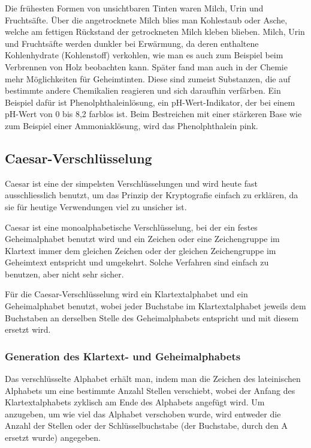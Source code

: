 Die frühesten Formen von unsichtbaren Tinten waren Milch, Urin und Fruchtsäfte. Über die angetrocknete Milch blies man Kohlestaub oder Asche, welche am fettigen Rückstand der getrockneten Milch kleben blieben. Milch, Urin und Fruchtsäfte werden dunkler bei Erwärmung, da deren enthaltene Kohlenhydrate (Kohlenstoff) verkohlen, wie man es auch zum Beispiel beim Verbrennen von Holz beobachten kann. Später fand man auch in der Chemie mehr Möglichkeiten für Geheimtinten. Diese sind zumeist Substanzen, die auf bestimmte andere Chemikalien reagieren und sich daraufhin verfärben. Ein Beispiel dafür ist Phenolphthaleinlösung, ein pH-Wert-Indikator, der bei einem pH-Wert von 0 bis 8,2 farblos ist. Beim Bestreichen mit einer stärkeren Base wie zum Beispiel einer Ammoniaklösung, wird das Phenolphthalein pink.


\newpage %
\subsection {Caesar-Verschlüsselung}
\label{sec:caesar-verschluesselung}

Caesar ist eine der simpelsten Verschlüsselungen und wird heute fast ausschliesslich benutzt, um das Prinzip der Kryptografie einfach zu erklären, da sie für heutige Verwendungen viel zu unsicher ist. \cite{wikipedia:caesar_verschluesselung}

Caesar ist eine monoalphabetische Verschlüsselung, bei der ein festes Geheimalphabet benutzt wird und ein Zeichen oder eine Zeichengruppe im Klartext immer dem gleichen Zeichen oder der gleichen Zeichengruppe im Geheimtext entspricht und umgekehrt. Solche Verfahren sind einfach zu benutzen, aber nicht sehr sicher.

Für die Caesar-Verschlüsselung wird ein Klartextalphabet und ein Geheimalphabet benutzt, wobei jeder Buchstabe im Klartextalphabet jeweils dem Buchstaben an derselben Stelle des Geheimalphabets entspricht und mit diesem ersetzt wird.

\subsubsection{Generation des Klartext- und Geheimalphabets}
\label{sec:c-generation}
Das verschlüsselte Alphabet erhält man, indem man die Zeichen des lateinischen Alphabets um eine bestimmte Anzahl Stellen verschiebt, wobei der Anfang des Klartextalphabets zyklisch am Ende des Alphabets angefügt wird. Um anzugeben, um wie viel das Alphabet verschoben wurde, wird entweder die Anzahl der Stellen oder der Schlüsselbuchstabe (der Buchstabe, durch den A ersetzt wurde) angegeben.

